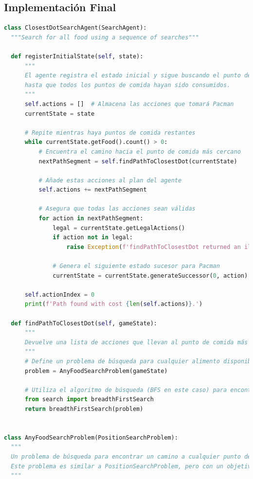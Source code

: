 \documentclass{report}
\begin{document}
        \subsection*{Implementación Final}
          \begin{lstlisting}[language=Python, caption=Implementación final del problema de las esquinas]
class ClosestDotSearchAgent(SearchAgent):
  """Search for all food using a sequence of searches"""

  def registerInitialState(self, state):
      """
      El agente registra el estado inicial y sigue buscando el punto de comida más cercano
      hasta que todos los puntos de comida hayan sido consumidos.
      """
      self.actions = []  # Almacena las acciones que tomará Pacman
      currentState = state

      # Repite mientras haya puntos de comida restantes
      while currentState.getFood().count() > 0:
          # Encuentra el camino hacia el punto de comida más cercano
          nextPathSegment = self.findPathToClosestDot(currentState)
          
          # Añade estas acciones al plan del agente
          self.actions += nextPathSegment

          # Asegura que todas las acciones sean válidas
          for action in nextPathSegment:
              legal = currentState.getLegalActions()
              if action not in legal:
                  raise Exception(f'findPathToClosestDot returned an illegal move: {action}!\n{currentState}')
              
              # Genera el siguiente estado sucesor para Pacman
              currentState = currentState.generateSuccessor(0, action)

      self.actionIndex = 0
      print(f'Path found with cost {len(self.actions)}.')

  def findPathToClosestDot(self, gameState):
      """
      Devuelve una lista de acciones que llevan al punto de comida más cercano, comenzando desde el estado actual del juego.
      """
      # Define un problema de búsqueda para cualquier alimento disponible
      problem = AnyFoodSearchProblem(gameState)

      # Utiliza el algoritmo de búsqueda (BFS en este caso) para encontrar el camino más corto hacia el punto de comida más cercano
      from search import breadthFirstSearch
      return breadthFirstSearch(problem)


class AnyFoodSearchProblem(PositionSearchProblem):
  """
  Un problema de búsqueda para encontrar un camino a cualquier punto de comida.
  Este problema es similar a PositionSearchProblem, pero con un objetivo distinto: cualquier punto de comida.
  """


\end{lstlisting}
\end{document}
